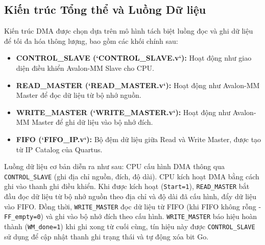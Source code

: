 \subsection{Kiến trúc Tổng thể và Luồng Dữ liệu}
Kiến trúc DMA được chọn dựa trên mô hình tách biệt luồng đọc và ghi dữ liệu để tối đa hóa thông lượng, bao gồm các khối chính sau:
\begin{itemize}
    \item \textbf{CONTROL\_SLAVE (`CONTROL\_SLAVE.v`):} Hoạt động như giao diện điều khiển Avalon-MM Slave cho CPU.
    \item \textbf{READ\_MASTER (`READ\_MASTER.v`):} Hoạt động như Avalon-MM Master để đọc dữ liệu từ bộ nhớ nguồn.
    \item \textbf{WRITE\_MASTER (`WRITE\_MASTER.v`):} Hoạt động như Avalon-MM Master để ghi dữ liệu vào bộ nhớ đích.
    \item \textbf{FIFO (`FIFO\_IP.v`):} Bộ đệm dữ liệu giữa Read và Write Master, được tạo từ IP Catalog của Quartus.
\end{itemize}
Luồng dữ liệu cơ bản diễn ra như sau: CPU cấu hình DMA thông qua \texttt{CONTROL\_SLAVE} (ghi địa chỉ nguồn, đích, độ dài). CPU kích hoạt DMA bằng cách ghi vào thanh ghi điều khiển. Khi được kích hoạt (\texttt{Start=1}), \texttt{READ\_MASTER} bắt đầu đọc dữ liệu từ bộ nhớ nguồn theo địa chỉ và độ dài đã cấu hình, đẩy dữ liệu vào FIFO. Đồng thời, \texttt{WRITE\_MASTER} đọc dữ liệu từ FIFO (khi FIFO không rỗng - \texttt{FF\_empty=0}) và ghi vào bộ nhớ đích theo cấu hình. \texttt{WRITE\_MASTER} báo hiệu hoàn thành (\texttt{WM\_done=1}) khi ghi xong từ cuối cùng, tín hiệu này được \texttt{CONTROL\_SLAVE} sử dụng để cập nhật thanh ghi trạng thái và tự động xóa bit Go.

